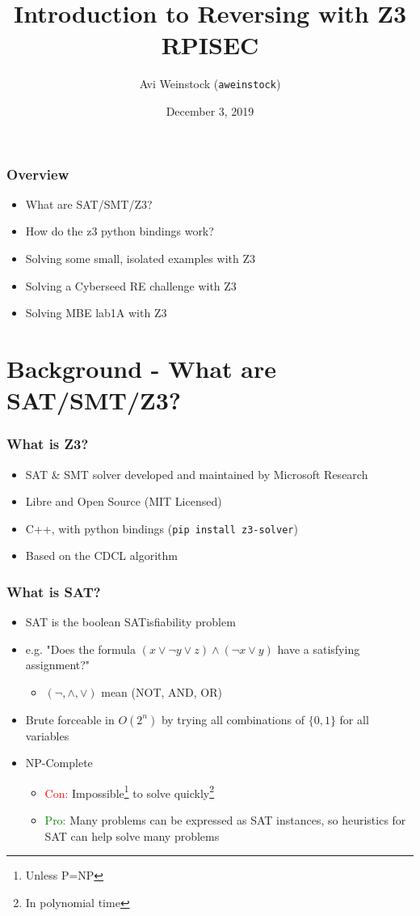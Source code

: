 \documentclass[aspectratio=169]{beamer}
\title{Introduction to Reversing with Z3\\RPISEC}
\date{December 3, 2019}
\author{Avi Weinstock (\Verb|aweinstock|)}
\begin{document}
\maketitle

\begin{frame}[fragile]
\frametitle{Overview}
\begin{itemize}
\item What are SAT/SMT/Z3?
\item How do the z3 python bindings work?
\item Solving some small, isolated examples with Z3
\item Solving a Cyberseed RE challenge with Z3
\item Solving MBE lab1A with Z3
\end{itemize}
\end{frame}

\section{Background - What are SAT/SMT/Z3?}

\begin{frame}[fragile]
\frametitle{What is Z3?}
\begin{itemize}
\item SAT \& SMT solver developed and maintained by Microsoft Research
\item Libre and Open Source (MIT Licensed)
\item C++, with python bindings (\verb|pip install z3-solver|)
\item Based on the CDCL algorithm
\end{itemize}
\end{frame}

\begin{frame}[fragile]
\frametitle{What is SAT?}
\begin{itemize}
\item SAT is the boolean SATisfiability problem
\item e.g. "Does the formula $(x \lor \neg y \lor z) \land (\neg x \lor y)$ have a satisfying assignment?"
\begin{itemize}
\item $(\neg, \land, \lor)$ mean (NOT, AND, OR)
\end{itemize}
\item Brute forceable in $O(2^n)$ by trying all combinations of $\{0,1\}$ for all variables
\item NP-Complete 
\begin{itemize}
\item \textcolor{red}{Con:} Impossible\footnote{Unless P=NP} to solve quickly\footnote{In polynomial time}
\item \textcolor{green}{Pro:} Many problems can be expressed as SAT instances, so heuristics for SAT can help solve many problems
\end{itemize}
\end{itemize}
\end{frame}
\end{document}
